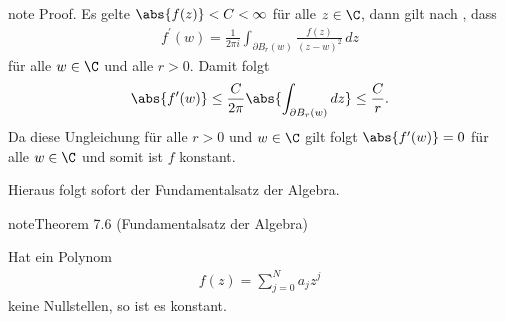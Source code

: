 \documentclass[letterpaper,10pt,german]{jupyterBook}
\begin{document}
\begin{sphinxadmonition}{note}
\sphinxAtStartPar
Proof. Es gelte \(\abs{f(z)}< C <\infty\) für alle \(z\in\C\), dann gilt nach {\hyperref[\detokenize{complexanalysis/cauchyintegral:cor:infholo}]{}}, dass
\begin{equation*}
\begin{split}f^\prime(w) = \frac{1}{2\pi i} \int_{\partial B_r(w)} \frac{f(z)}{(z-w)^2}\, dz\end{split}
\end{equation*}
\sphinxAtStartPar
für alle \(w\in \C\) und alle \(r> 0\). Damit folgt
\begin{equation*}
\begin{split}\abs{f^\prime(w)}\leq \frac{C}{2 \pi} \abs{\int_{\partial B_r(w)} dz}\leq \frac{C}{r}.\end{split}
\end{equation*}
\sphinxAtStartPar
Da diese Ungleichung für alle \(r>0\) und \(w\in\C\) gilt folgt \(\abs{f^\prime(w)} = 0\) für alle \(w\in\C\) und somit ist \(f\) konstant.
\end{sphinxadmonition}

\sphinxAtStartPar
Hieraus folgt sofort der Fundamentalsatz der Algebra.
\label{complexanalysis/cauchyintegral:theorem-11}
\begin{sphinxadmonition}{note}{Theorem 7.6 (Fundamentalsatz der Algebra)}



\sphinxAtStartPar
Hat ein Polynom
\begin{equation*}
\begin{split}f(z)=\sum_{j=0}^N a_j z^j\end{split}
\end{equation*}
\sphinxAtStartPar
keine Nullstellen, so ist es konstant.
\end{sphinxadmonition}
\end{document}
